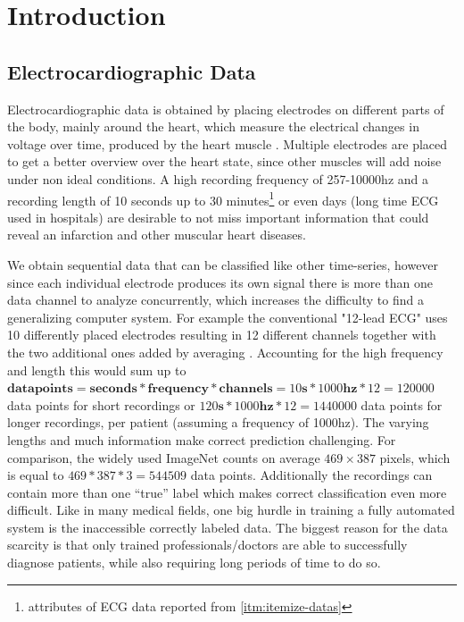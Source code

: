 \section{Introduction}\raggedbottom

\subsection{Electrocardiographic Data}
Electrocardiographic data is obtained by placing electrodes on different parts of the body, mainly around the heart, which measure the electrical changes in voltage over time, produced by the heart muscle \autocite{ElectrocardiographyWikipedia-2021-01-14}. Multiple electrodes are placed to get a better overview over the heart state, since other muscles will add noise under non ideal conditions. A high recording frequency of 257-10000hz and a recording length of 10 seconds up to 30 minutes\footnote{attributes of ECG data reported from \ref{itm:itemize-datas}} or even days (long time ECG used in hospitals) are desirable to not miss important information that could reveal an infarction and other muscular heart diseases.
 
We obtain sequential data that can be classified like other time-series, however since each individual electrode produces its own signal there is more than one data channel to analyze concurrently, which increases the difficulty to find a generalizing computer system. For example the conventional "12-lead ECG" uses 10 differently placed electrodes resulting in 12 different channels together with the two additional ones added by averaging \autocite{12LeadECGPlacementGuidewithIllustrations-2021-09-28}. Accounting for the high frequency and length this would sum up to $\mathbf{data points}=\mathbf{seconds}*\mathbf{frequency}*\mathbf{channels}=10\mathbf{s}*1000\mathbf{hz}*12=120000$ data points for short recordings or $120\mathbf{s}*1000\mathbf{hz}*12=1440000$ data points for longer recordings, per patient (assuming a frequency of 1000hz). The varying lengths and much information make correct prediction challenging. For comparison, the widely used ImageNet \autocite{ImageNet-2021-01-14} counts on average $469\times387$ pixels\autocite{stack-imagenet}, which is equal to $469*387*3=544509$ data points. Additionally the recordings can contain more than one \enquote{true} label which makes correct classification even more difficult. Like in many medical fields, one big hurdle in training a fully automated system is the inaccessible correctly labeled data. The biggest reason for the data scarcity is that only trained professionals/doctors are able to successfully diagnose patients, while also requiring long periods of time to do so.  

